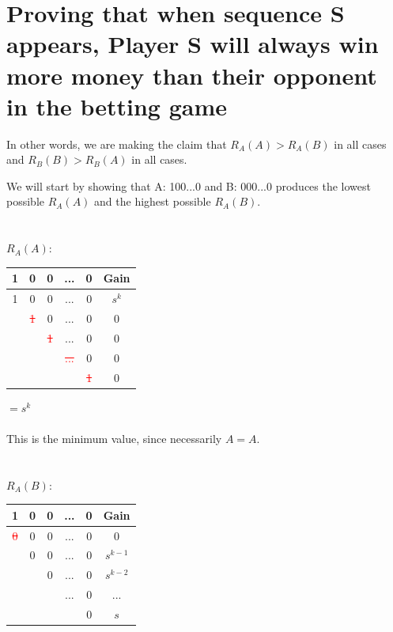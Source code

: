 \documentclass[english,12pt,a4paper,final]{article}
\begin{document}
\section{Proving that when sequence S appears, Player S will always win more money than their opponent in the betting game}

In other words, we are making the claim that $R_A(A)>R_A(B)$ in all cases and $R_B(B)>R_B(A)$ in all cases.

We will start by showing that A: 100...0 and B: 000...0 produces the lowest possible $R_A(A)$ and the highest possible $R_A(B)$.
\\\\\\
${R_A(A)}$:
\begin{tabular}{|ccccc|c|}
	\hline
	1 & 0 & 0 & ... & 0 & Gain \\
	\hline
	
	\textcolor{OliveGreen}{1} & \textcolor{OliveGreen}{0} & \textcolor{OliveGreen}{0} & \textcolor{OliveGreen}{...} & \textcolor{OliveGreen}{0} & $s^k$\\
	
	& \textcolor{red}{\sout{1}} & 0 & ... & 0 & $0$ \\
	
	&  & \textcolor{red}{\sout{1}} & ... & 0 & $0$ \\
	
	&  &  & \textcolor{red}{\sout{...}} & 0 & $0$ \\
	
	&  &  &  & \textcolor{red}{\sout{1}} & $0$ \\
	\hline
\end{tabular}
$=s^k$
\\\\
This is the minimum value, since necessarily $A=A$.
\\\\\\
${R_A(B)}$:
\begin{tabular}{|ccccc|c|}
	\hline
	1 & 0 & 0 & ... & 0 & Gain \\
	\hline
	
	\textcolor{red}{\sout{0}} & 0 & 0 & ... & 0 & 0\\
	
	& \textcolor{OliveGreen}{0} & \textcolor{OliveGreen}{0} & \textcolor{OliveGreen}{...} & \textcolor{OliveGreen}{0} & $s^{k-1}$\\
	
	&  & \textcolor{OliveGreen}{0} & \textcolor{OliveGreen}{...} & \textcolor{OliveGreen}{0} & $s^{k-2}$ \\
	
	&  &  & \textcolor{OliveGreen}{...} & \textcolor{OliveGreen}{0} & ... \\
	
	&  &  &  & \textcolor{OliveGreen}{0} & $s$ \\
	\hline
\end{tabular}
\end{document}
